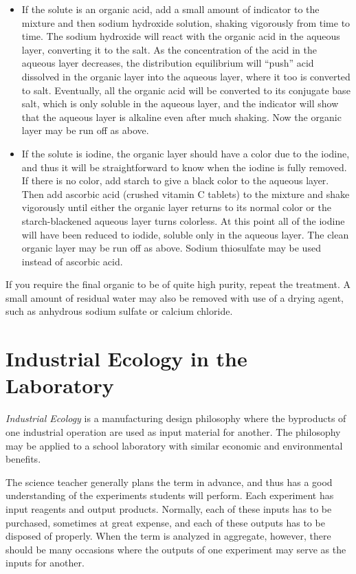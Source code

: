 \begin{itemize}
\item If the solute is an organic acid, 
add a small amount of indicator to the mixture 
and then sodium hydroxide solution, 
shaking vigorously from time to time. 
The sodium hydroxide will react with the organic acid 
in the aqueous layer, 
converting it to the salt. 
As the concentration of the acid in the aqueous layer decreases, 
the distribution equilibrium will ``push'' acid dissolved 
in the organic layer into the aqueous layer, 
where it too is converted to salt. 
Eventually, 
all the organic acid will be converted to its conjugate base salt, 
which is only soluble in the aqueous layer, 
and the indicator will show that the aqueous layer 
is alkaline even after much shaking. 
Now the organic layer may be run off as above.

\item If the solute is iodine, 
the organic layer should have a color due to the iodine, 
and thus it will be straightforward 
to know when the iodine is fully removed. 
If there is no color, 
add starch to give a black color to the aqueous layer. 
Then add ascorbic acid (crushed vitamin C tablets) 
to the mixture and shake vigorously 
until either the organic layer returns to its normal color 
or the starch-blackened aqueous layer turns colorless. 
At this point all of the iodine will have been reduced to iodide, 
soluble only in the aqueous layer. 
The clean organic layer may be run off as above. 
Sodium thiosulfate may be used instead of ascorbic acid.
\end{itemize}

If you require the final organic to be of quite high purity, 
repeat the treatment. 
A small amount of residual water 
may also be removed with use of a drying agent, 
such as anhydrous sodium sulfate or calcium chloride.

\section{Industrial Ecology in the Laboratory} 

\textit{Industrial Ecology} is a manufacturing design philosophy 
where the byproducts of one industrial operation 
are used as input material for another. 
The philosophy may be applied to a school laboratory 
with similar economic and environmental benefits.

The science teacher generally plans the term in advance, 
and thus has a good understanding of the experiments students will perform. 
Each experiment has input reagents and output products. 
Normally, 
each of these inputs has to be purchased, 
sometimes at great expense, 
and each of these outputs has to be disposed of properly. 
When the term is analyzed in aggregate, 
however, 
there should be many occasions where the outputs of one experiment 
may serve as the inputs for another.

